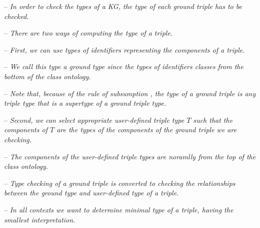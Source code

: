 \documentclass[runningheads]{llncs}
\newcommand{\notes}[1]{\noindent\begin{small}-- \emph{#1}\hfill\break\end{small}}
\newcommand{\nnotes}[1]{\indent\begin{small}-- \emph{#1}\hfill\break\end{small}}
\begin{document}
\notes{In order to check the types of a KG, the type of each ground triple has to be checked.}
\notes{There are two ways of computing the type of a triple.}
\notes{First, we can use types of identifiers representing the components of a triple.}
\nnotes{We call this type a \emph{ground type} since the types of identifiers classes from the bottom of the class ontology.}
\nnotes{Note that, because of the rule of subsumption \cite{Pierce}, the type of a ground triple is any triple type that is a supertype of a ground triple type.}
\notes{Second, we can select appropriate user-defined triple type $T$ such that the components of $T$ are the types of the components of the ground triple we are checking.}
\nnotes{The components of the user-defined triple types are noramlly from the top of the class ontology.}
\nnotes{Type checking of a ground triple is converted to checking the relationships between the ground type and user-defined type of a triple.} 
\notes{In all contexts we want to determine \emph{minimal type} of a triple, having the smallest interpretation.}

  

\end{document}
